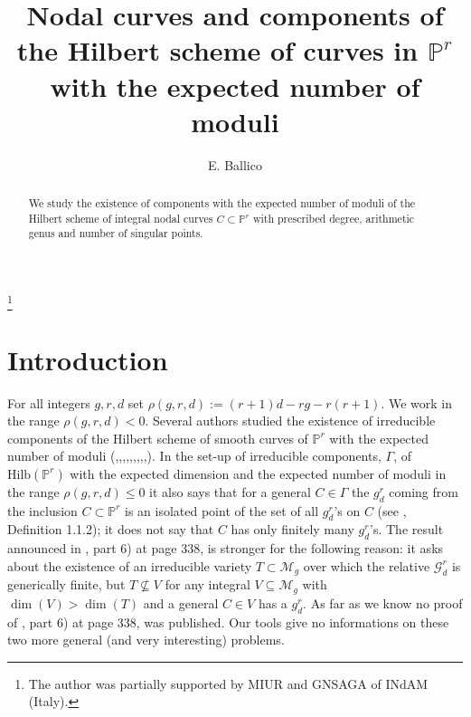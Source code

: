 \documentclass{amsart}
\theoremstyle{plain}
\theoremstyle{definition}
\begin{document}
\title[nodal curves]
{Nodal curves and components of the Hilbert scheme of curves in $\mathbb {P}^r$ with the expected number of moduli}
\author{E. Ballico}
\address{Dept. of Mathematics\\
 University of Trento\\
38123 Povo (TN), Italy}
\thanks{The author was partially supported by MIUR and GNSAGA of INdAM (Italy).}

\begin{abstract}
We study the existence of components with the expected number of moduli of the
Hilbert scheme of integral nodal curves $C \subset \mathbb {P}^r$ with prescribed degree, arithmetic genus and number
of singular points.
\end{abstract}

\maketitle

\section{Introduction}\label{S1}

For all integers $g, r, d$ set $\rho (g,r,d):= (r+1)d -rg -r(r+1)$.  We work in the range
$\rho (g,r,d) <0$. Several authors studied the existence of irreducible components of the Hilbert scheme of smooth curves of $\mathbb {P}^r$ with the expected number of moduli (\cite{s1},\cite{eh1},\cite{eh2},\cite{be4},\cite{be},\cite{l1},\cite{p},\cite{l2},\cite{e},\cite{st}). In the set-up of irreducible components, $\Gamma$, of $\mbox{Hilb}(\mathbb {P}^r)$ with the expected dimension and the expected number of moduli in the range $\rho (g,r,d)\le 0$ it also says that for a general $C\in \Gamma$
the $g^r_d$ coming from the inclusion $C\subset \mathbb {P}^r$ is an isolated point of the set of all $g^r_d$'s on $C$ (see \cite{p}, Definition 1.1.2); it does not say that $C$ has only finitely many $g^r_d$'s. The result announced in \cite{eh1}, part 6) at page 338, is stronger for the following reason: it asks about the existence of an irreducible variety $T\subset \mathcal {M}_g$ over which the relative $\mathcal {G}^r_d$ is generically finite, but
$T\nsubseteq V$ for any integral $V\subseteq \mathcal {M}_g$ with $\dim (V) > \dim (T)$ and a general $C\in V$ has a $g^r_d$. As far as we know no proof of \cite{eh1}, part 6) at page 338, was published. Our tools give no informations on these two more general (and very interesting) problems.
\end{document}
